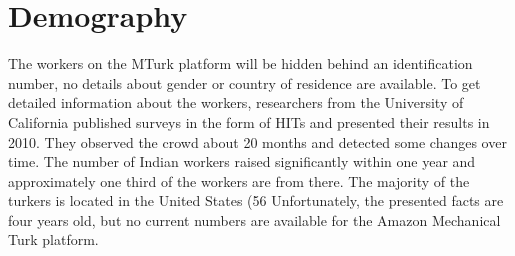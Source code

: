 \section{Demography}
The workers on the MTurk platform will be hidden behind an identification number, no details about gender or country of residence are available. To get detailed information about the workers, researchers from the University of California published surveys in the form of HITs\cite{ross} and presented their results in 2010. They observed the crowd about 20 months and detected some changes over time. The number of Indian workers raised significantly within one year and approximately one third of the workers are from there. The majority of the turkers is located in the United States (56%
Unfortunately, the presented facts are four years old, but no current numbers are available for the Amazon Mechanical Turk platform.

